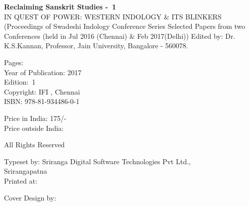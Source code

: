 \thispagestyle{empty}
\noindent
{\bf Reclaiming Sanskrit Studies - 1}\\
IN QUEST OF POWER: WESTERN INDOLOGY \& ITS BLINKERS 
(Proceedings of Swadeshi Indology Conference Series
Selected Papers from two Conferences (held in Jul 2016 (Chennai) \& Feb 2017(Delhi))
Edited by: Dr. K.S.Kannan, Professor, Jain University, Bangalore - 560078.
\vfill

\noindent
Pages: \pageref{book:end}\\
Year of Publication: 2017\\
Edition: 1\\
Copyright: IFI , Chennai\\ 
ISBN: 978-81-934486-0-1
\vfill

\noindent
Price in India: 175/-\\
Price outside India:
\vfill

\noindent
All Rights Reserved
\vfill

\noindent
Typeset by: Sriranga Digital Software Technologies Pvt Ltd.,\\ 
Srirangapatna\\

\noindent
Printed at:

\noindent
Cover Design by:
